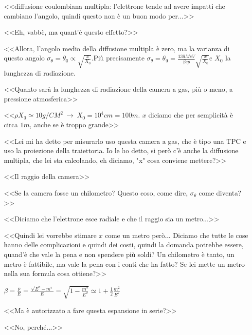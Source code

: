 \documentclass[../main.tex]{subfiles}
\begin{document}
\begin{enumerate}
{        \begin{flushright}
        <<diffusione coulombiana multipla: l'elettrone tende ad avere impatti che cambiano l'angolo, quindi questo non è un buon modo per...>>
        \end{flushright}
        <<Eh, vabbè, ma quant'è questo effetto?>>
        \begin{flushright}
        <<Allora, l'angolo medio della diffusione multipla è zero, ma la varianza di questo angolo \(\sigma_\theta=\theta_0\propto\sqrt{\frac{x}{X_0}}\).Più precisamente \(\sigma_\theta=\theta_0=\frac{136 MeV}{\beta c p}\sqrt{\frac{x}{X_0}}\)e $X_0$ la lunghezza di radiazione.
        \end{flushright}
        <<Quanto sarà la lunghezza di radiazione della camera a gas, più o meno, a pressione atmosferica>>
        \begin{flushright}
        <<\(\rho X_0\simeq 10 g/CM^2 \ \rightarrow \ X_0=10^4cm=100m\). $x$ diciamo che per semplicità è circa $1 m$, anche se è troppo grande>>
        \end{flushright}
        <<Lei mi ha detto per misurarlo uso questa camera a gas, che è tipo una TPC e uso la proiezione della traiettoria. Io le ho detto, sì però c'è anche la diffusione multipla, che lei sta calcolando, eh diciamo, "x" cosa conviene mettere?>>
        \begin{flushright}
        <<Il raggio della camera>>
        \end{flushright}
        <<Se la camera fosse un chilometro? Questo coso, come dire, $\sigma_\theta$ come diventa?>>
        \begin{flushright}
        <<Diciamo che l'elettrone esce radiale e che il raggio sia un metro...>>
        \end{flushright}
        <<Quindi lei vorrebbe stimare $x$ come un metro però... Diciamo che tutte le cose hanno delle complicazioni e quindi dei costi, quindi la domanda potrebbe essere, quand'è che vale la pena e non spendere più soldi? Un chilometro è tanto, un metro è fattibile, ma vale la pena con i conti che ha fatto? Se lei mette un metro nella sua formula cosa ottiene?>>
        \begin{flushright}
        \(\beta=\frac{p}{E}=\frac{\sqrt{E^2-m^2}}{E}=\sqrt{1-\frac{m^2}{E^2}}\simeq 1+\frac{1}{2}\frac{m^2}{E^2}\)
        \end{flushright}
        <<Ma è autorizzato a fare questa espansione in serie?>>
        \begin{flushright}
        <<No, perché...>>

\end{flushright}}
\end{enumerate}
\end{document}

